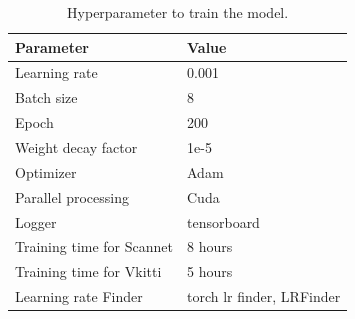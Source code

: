 	\begin{table}[h]
		\begin{center}
			\begin{tabular}{ | l | p{4cm} |}
				\hline
				
				\cellcolor{purple!30}Parameter & \cellcolor{purple!30}Value \\ \hline
				Learning rate & 0.001  \\ \hline
				Batch size & 8 \\ \hline
				Epoch & 200 \\ \hline
				Weight decay factor & 1e-5
				\\ \hline
				Optimizer & Adam  \\ \hline
				Parallel processing & Cuda  \\ \hline
				Logger & tensorboard  \\ \hline
				Training time for Scannet & 8 hours  \\ \hline
				Training time for Vkitti & 5 hours  \\ \hline
				Learning rate Finder & torch lr finder, LRFinder   \\ \hline
				\hline
			\end{tabular}
			\caption{Hyperparameter to train the model.}
			\label{table:parameters}
		\end{center}
	\end{table}
    

